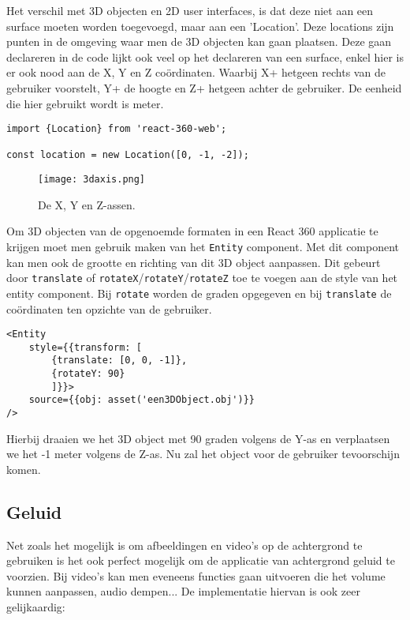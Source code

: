 Het verschil met 3D objecten en 2D user interfaces, is dat deze niet aan een surface moeten worden toegevoegd, maar aan een 'Location'. Deze locations zijn  punten in de omgeving waar men de 3D objecten kan gaan plaatsen. Deze gaan declareren in de code lijkt ook veel op het declareren van een surface, enkel hier is er ook nood aan de X, Y en Z coördinaten. Waarbij X+ hetgeen rechts van de gebruiker voorstelt, Y+ de hoogte en Z+ hetgeen achter de gebruiker. De eenheid die hier gebruikt wordt is meter.

\begin{lstlisting}[frame=single, caption=Voorbeeld van een location]
import {Location} from 'react-360-web';

const location = new Location([0, -1, -2]);
\end{lstlisting}

\begin{figure}[H]
	\centering
	\texttt{[image: 3daxis.png]}
	\caption{De X, Y en Z-assen.}
	\label{fig:xyz-axis}
\end{figure}

Om 3D objecten van de opgenoemde formaten in een React 360 applicatie te krijgen moet men gebruik maken van het \lstinline[basicstyle=\ttfamily\color{red}]|Entity| component. Met dit component kan men ook de grootte en richting van dit 3D object aanpassen. Dit gebeurt door \lstinline[basicstyle=\ttfamily\color{red}]|translate| of \lstinline[basicstyle=\ttfamily\color{red}]|rotateX|/\lstinline[basicstyle=\ttfamily\color{red}]|rotateY|/\lstinline[basicstyle=\ttfamily\color{red}]|rotateZ| toe te voegen aan de style van het entity component. Bij \lstinline[basicstyle=\ttfamily\color{red}]|rotate| worden de graden opgegeven en bij \lstinline[basicstyle=\ttfamily\color{red}]|translate| de coördinaten ten opzichte van de gebruiker.

\begin{lstlisting}[frame=single, caption=Voorbeeld van een Entity component]
<Entity 
	style={{transform: [
		{translate: [0, 0, -1]},
		{rotateY: 90}
		]}}>
	source={{obj: asset('een3DObject.obj')}}
/>
\end{lstlisting}

Hierbij draaien we het 3D object met 90 graden volgens de Y-as en verplaatsen we het -1 meter volgens de Z-as. Nu zal het object voor de gebruiker tevoorschijn komen.

\subsection{Geluid}
\label{subsec:Geluid}
Net zoals het mogelijk is om afbeeldingen en video's op de achtergrond te gebruiken is het ook perfect mogelijk om de applicatie van achtergrond geluid te voorzien. Bij video’s kan men eveneens functies gaan uitvoeren die het volume kunnen aanpassen, audio dempen... De implementatie hiervan is ook zeer gelijkaardig:

